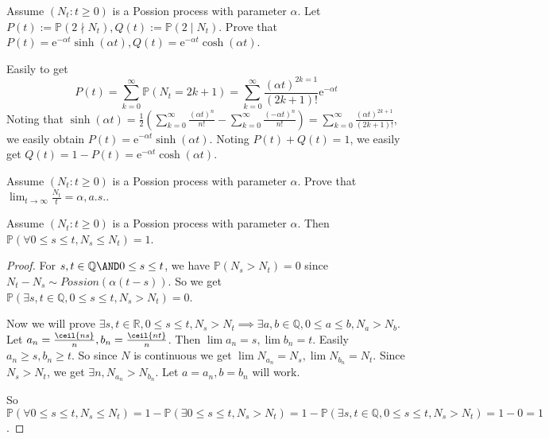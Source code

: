 \documentclass{ctexart}
\begin{document}
\begin{problem}\label{pro:1}
  Assume \((N_t:t \geq 0)\) is a Possion process with parameter \(\alpha\).
  Let \(P(t):=\mathbb{P}(2 \nmid N_t),Q(t):=\mathbb{P}(2 \mid N_t)\).
  Prove that \(P(t)=\mathrm{e}^{-\alpha t}\sinh(\alpha t),Q(t)=\mathrm{e}^{-\alpha t}\cosh(\alpha t)\).
\end{problem}
\begin{solution}
  Easily to get
  \[
    P(t)=\sum_{k=0}^{\infty}\mathbb{P}(N_t=2k+1)=\sum_{k=0}^{\infty}\frac{(\alpha t)^{2k=1}}{(2k+1)!}\mathrm{e}^{-\alpha t}
  \]
  Noting that \(\sinh(\alpha t)=\frac{1}{2}\left(\sum_{k=0}^{\infty}\frac{(\alpha t)^n}{n!}-\sum_{k=0}^{\infty}\frac{(-\alpha t)^n}{n!}\right)=\sum_{k=0}^{\infty}\frac{(\alpha t)^{2k+1}}{(2k+1)!}\),
  we easily obtain \(P(t)=\mathrm{e}^{-\alpha t}\sinh(\alpha t)\).
  Noting \(P(t)+ Q(t)=1\), we easily get \(Q(t)=1-P(t)=\mathrm{e}^{-\alpha t}\cosh(\alpha t)\).
\end{solution}
\begin{problem}\label{pro:2}
  Assume \((N_t:t \geq 0)\) is a Possion process with parameter \(\alpha\).
  Prove that \(\lim_{t \to \infty}\frac{N_t}{t}=\alpha,a.s.\).
\end{problem}
\begin{lemma}\label{lem:1}
  Assume \((N_t:t \geq 0)\) is a Possion process with parameter \(\alpha\).
  Then \(\mathbb{P}(\forall 0 \leq s \leq t,N_s \leq N_t)=1\).
\end{lemma}
\begin{proof}
  For \(s,t \in \mathbb{Q} \AND 0 \leq s \leq t\), we have \(\mathbb{P}(N_s > N_t)=0\) since \(N_t - N_s \sim Possion(\alpha(t-s))\).
  So we get \(\mathbb{P}(\exists s,t \in \mathbb{Q},0 \leq s \leq t,N_s>N_t)=0\).

  Now we will prove \(\exists s,t \in \mathbb{R},0 \leq s \leq t,N_s>N_t \implies \exists a,b \in \mathbb{Q},0 \leq a \leq b,N_a > N_b\).
  Let \(a_n= \frac{\ceil{ns}}{n},b_n=\frac{\ceil{nt}}{n}\). Then \(\lim a_n=s,\lim b_n=t\). Easily \(a_n \geq s,b_n \geq t\).
  So since \(N\) is continuous we get \(\lim N_{a_n}=N_s,\lim N_{b_n}=N_t\).
  Since \(N_s>N_t\), we get \(\exists n,N_{a_n}>N_{b_n}\). Let \(a=a_n,b=b_n\) will work.

  So \(\mathbb{P}(\forall 0 \leq s \leq t,N_s \leq N_t)=1-\mathbb{P}(\exists 0 \leq s \leq t,N_s>N_t)=1-\mathbb{P}(\exists s,t \in \mathbb{Q},0 \leq s \leq t,N_s>N_t)=1-0=1\).
\end{proof}
\end{document}
